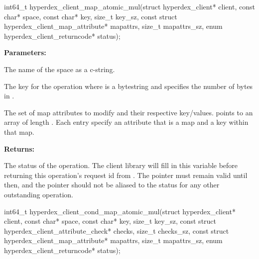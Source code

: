 \funcsep
{}
\begin{ccode}
int64_t hyperdex_client_map_atomic_mul(struct hyperdex_client* client,
                const char* space,
                const char* key, size_t key_sz,
                const struct hyperdex_client_map_attribute* mapattrs, size_t mapattrs_sz,
                enum hyperdex_client_returncode* status);
\end{ccode}
\funcdesc 

\noindent\textbf{Parameters:}
\begin{description}[labelindent=\widthof{{\code{mapattrs}, \code{mapattrs\_sz}}},leftmargin=*,noitemsep,nolistsep,align=right]
\item[\code{space}] The name of the space as a c-string.
\item[\code{key}, \code{key\_sz}] The key for the operation where  is a bytestring and  specifies the number of bytes in .
\item[\code{mapattrs}, \code{mapattrs\_sz}] The set of map attributes to modify and their respective key/values.   points to an array of length .  Each entry specify an attribute that is a map and a key within that map.
\end{description}

\noindent\textbf{Returns:}
\begin{description}[labelindent=\widthof{{\code{status}}},leftmargin=*,noitemsep,nolistsep,align=right]
\item[\code{status}] The status of the operation.  The client library will fill in this variable before returning this operation's request id from .  The pointer must remain valid until then, and the pointer should not be aliased to the status for any other outstanding operation.
\end{description}

\funcsep
{}
\begin{ccode}
int64_t hyperdex_client_cond_map_atomic_mul(struct hyperdex_client* client,
                const char* space,
                const char* key, size_t key_sz,
                const struct hyperdex_client_attribute_check* checks, size_t checks_sz,
                const struct hyperdex_client_map_attribute* mapattrs, size_t mapattrs_sz,
                enum hyperdex_client_returncode* status);
\end{ccode}
\funcdesc 


